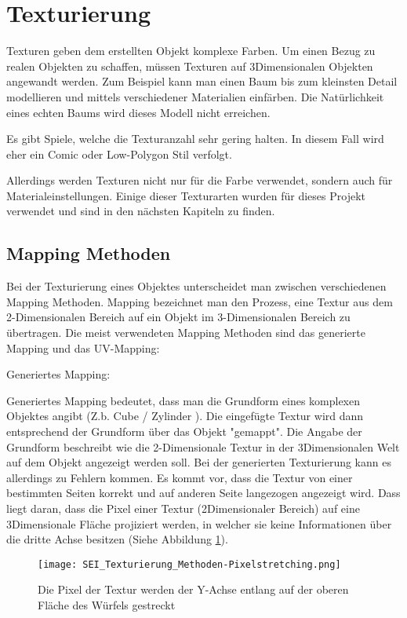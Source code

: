 \section{Texturierung}
\label{sec:tex}
Texturen geben dem erstellten Objekt komplexe Farben. Um einen Bezug zu realen Objekten zu schaffen, müssen Texturen
auf 3Dimensionalen Objekten angewandt werden. Zum Beispiel kann man einen Baum bis
zum kleinsten Detail modellieren und mittels verschiedener Materialien einfärben. Die Natürlichkeit
eines echten Baums wird dieses Modell nicht erreichen.

Es gibt Spiele, welche die Texturanzahl sehr gering halten. In diesem Fall wird eher ein Comic
oder Low-Polygon Stil verfolgt.

Allerdings werden Texturen nicht nur für die Farbe verwendet, sondern auch für Materialeinstellungen.
Einige dieser Texturarten wurden für dieses Projekt verwendet und
sind in den nächsten Kapiteln zu finden.

\subsection{Mapping Methoden}
\label{sec:tex_mapping}

Bei der Texturierung eines Objektes unterscheidet man zwischen verschiedenen Mapping Methoden. Mapping bezeichnet man
den Prozess, eine Textur aus dem 2-Dimensionalen Bereich auf ein Objekt im 3-Dimensionalen Bereich zu übertragen. Die
meist verwendeten Mapping Methoden sind das generierte Mapping und das UV-Mapping\citep{blender:tex_mapping_modes}:


Generiertes Mapping:

Generiertes Mapping bedeutet, dass man die Grundform eines komplexen Objektes angibt (Z.b. Cube / Zylinder ). Die
eingefügte Textur wird dann entsprechend der Grundform über das Objekt "gemappt". Die Angabe der Grundform beschreibt
wie die 2-Dimensionale Textur in der 3Dimensionalen Welt auf dem Objekt angezeigt werden soll.
Bei der generierten Texturierung kann es allerdings zu Fehlern kommen. Es kommt vor, dass die Textur von einer
bestimmten Seiten korrekt und auf anderen Seite langezogen angezeigt wird. Dass liegt daran, dass die Pixel einer
Textur (2Dimensionaler Bereich) auf eine 3Dimensionale Fläche projiziert werden, in welcher sie keine Informationen
über die dritte Achse besitzen (Siehe Abbildung \ref{picture:tex_streching}).

\begin{figure}[h]
    \centering
    \texttt{[image: SEI\_Texturierung\_Methoden-Pixelstretching.png]}
    \caption{Die Pixel der Textur werden der Y-Achse entlang auf der oberen Fläche des Würfels gestreckt}
    \label{picture:tex_streching}
\end{figure}


